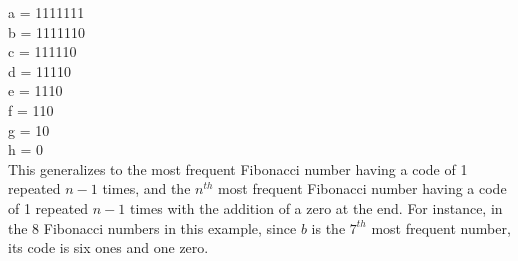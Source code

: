 \documentclass[11pt]{article}
\begin{document}
\begin{multicols}{2}
\noindent a = 1111111\\
b = 1111110\\
c = 111110\\
d = 11110\\
e = 1110\\
f = 110\\
g = 10\\
h = 0\\

This generalizes to the most frequent Fibonacci number having a code of 1 repeated $n-1$ times, and the $n^{th}$ most frequent Fibonacci number having a code of 1 repeated $n-1$ times with the addition of a zero at the end. For instance, in the 8 Fibonacci numbers in this example, since $b$ is the $7^{th}$ most frequent number, its code is six ones and one zero.\\

\end{multicols}
\end{document}
